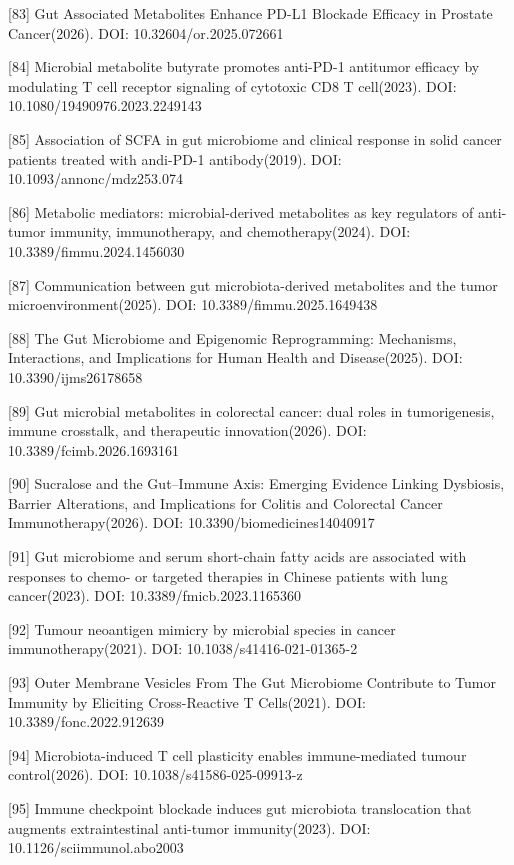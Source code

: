 {[}83{]} Gut Associated Metabolites Enhance PD-L1 Blockade Efficacy in Prostate Cancer(2026). DOI: 10.32604/or.2025.072661

{[}84{]} Microbial metabolite butyrate promotes anti-PD-1 antitumor efficacy by modulating T cell receptor signaling of cytotoxic CD8 T cell(2023). DOI: 10.1080/19490976.2023.2249143

{[}85{]} Association of SCFA in gut microbiome and clinical response in solid cancer patients treated with andi-PD-1 antibody(2019). DOI: 10.1093/annonc/mdz253.074

{[}86{]} Metabolic mediators: microbial-derived metabolites as key regulators of anti-tumor immunity, immunotherapy, and chemotherapy(2024). DOI: 10.3389/fimmu.2024.1456030

{[}87{]} Communication between gut microbiota-derived metabolites and the tumor microenvironment(2025). DOI: 10.3389/fimmu.2025.1649438

{[}88{]} The Gut Microbiome and Epigenomic Reprogramming: Mechanisms, Interactions, and Implications for Human Health and Disease(2025). DOI: 10.3390/ijms26178658

{[}89{]} Gut microbial metabolites in colorectal cancer: dual roles in tumorigenesis, immune crosstalk, and therapeutic innovation(2026). DOI: 10.3389/fcimb.2026.1693161

{[}90{]} Sucralose and the Gut--Immune Axis: Emerging Evidence Linking Dysbiosis, Barrier Alterations, and Implications for Colitis and Colorectal Cancer Immunotherapy(2026). DOI: 10.3390/biomedicines14040917

{[}91{]} Gut microbiome and serum short-chain fatty acids are associated with responses to chemo- or targeted therapies in Chinese patients with lung cancer(2023). DOI: 10.3389/fmicb.2023.1165360

{[}92{]} Tumour neoantigen mimicry by microbial species in cancer immunotherapy(2021). DOI: 10.1038/s41416-021-01365-2

{[}93{]} Outer Membrane Vesicles From The Gut Microbiome Contribute to Tumor Immunity by Eliciting Cross-Reactive T Cells(2021). DOI: 10.3389/fonc.2022.912639

{[}94{]} Microbiota-induced T cell plasticity enables immune-mediated tumour control(2026). DOI: 10.1038/s41586-025-09913-z

{[}95{]} Immune checkpoint blockade induces gut microbiota translocation that augments extraintestinal anti-tumor immunity(2023). DOI: 10.1126/sciimmunol.abo2003

